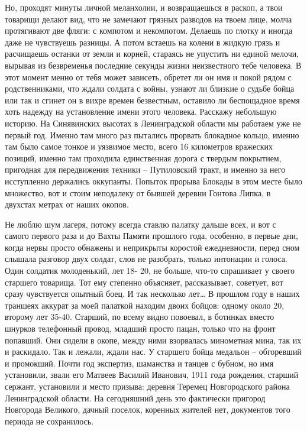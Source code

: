 Но, проходят минуты личной меланхолии, и возвращаешься в раскоп, а твои
товарищи делают вид, что не замечают грязных разводов на твоем лице, молча
протягивают две фляги: с компотом и некомпотом. Делаешь по глотку и иногда даже
не чувствуешь разницы. А потом встаешь на колени в жидкую грязь и расчищаешь
останки от земли и корней, стараясь не упустить ни единой мелочи, вырывая из
безвременья последние секунды жизни неизвестного тебе человека. В этот момент
менно от тебя может зависеть, обретет ли он имя и покой рядом с родственниками,
что ждали солдата с войны, узнают ли близкие о судьбе бойца или так и сгинет он
в вихре времен безвестным, оставило ли беспощадное время хоть надежду на
установление имени этого человека.  Расскажу небольшую историю. На Синявинских
высотах в Ленинградской области мы работаем уже не первый год. Именно там много
раз пытались прорвать блокадное кольцо, именно там было самое тонкое и уязвимое
место, всего 16 километров вражеских позиций, именно там проходила единственная
дорога с твердым покрытием, пригодная для передвижения техники – Путиловский
тракт, и именно за него исступленно держались оккупанты. Попыток прорыва
Блокады в этом месте было множество, вот и стоим неподалеку от бывшей деревни
Гонтова Липка, в двухстах метрах от наших окопов.

Не люблю шум лагеря, потому всегда ставлю палатку дальше всех, и вот с самого первого раза и до Вахты Памяти прошлого года, особенно, в первые дни, когда нервы просто обнажены и неприкрыты коростой ежедневности, перед сном слышала разговор двух солдат, слов не разобрать, только интонации и голоса. Один солдатик молоденький, лет 18- 20, не больше, что-то спрашивает у своего старшего товарища. Тот ему степенно объясняет, рассказывает, советует, вот сразу чувствуется опытный боец. И так несколько лет…
В прошлом году в наших траншеях аккурат за моей палаткой находим двоих бойцов: одному около 20, второму лет 35-40. Старший, по всему видно повоевал, в ботинках вместо шнурков телефонный провод, младший просто пацан, только что на фронт попавший. Они сидели в окопе, между ними взорвалась минометная мина, так их и раскидало. Так и лежали, ждали нас. У старшего бойца медальон – обгоревший и промокший. Почти год экспертиз, шаманства и танцев с бубном, но имя установили, звали его Матвеев Василий Иванович, 1911 года рождения, старший сержант, установили и место призыва: деревня Теремец Новгородского района Ленинградской области. На сегодняшний день это фактически пригород Новгорода Великого, дачный поселок, коренных жителей нет, документов того периода не сохранилось.

